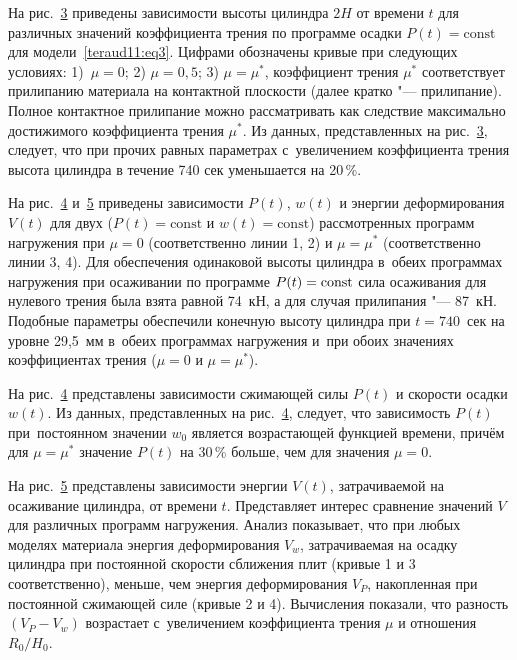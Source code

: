 На рис.~\hyperlink{teraud:pict3}{3} приведены зависимости высоты цилиндра $2H$ от времени $t$ для различных значений коэффициента трения по программе
осадки \mbox{$P(t)=\text{const}$} для модели~\eqref{teraud11:eq3}. 
Цифрами обозначены кривые при следующих условиях: 1)~$\mu =0$; 2) $\mu =0,5$; 3) $\mu =\mu^{*}$, коэффициент трения $\mu^{*}$ соответствует прилипанию материала
на контактной плоскости (далее кратко "--- прилипание). Полное контактное прилипание можно рассматривать как следствие
максимально достижимого коэффициента трения $\mu^{*}$. Из данных, представленных на рис.~\hyperlink{teraud:pict3}{3}, следует, что при прочих равных параметрах с~увеличением коэффициента трения высота цилиндра в течение 740 сек уменьшается на 20\,\%.



На рис.~\hyperlink{teraud:pict4}{4} и~\hyperlink{teraud:pict5}{5} приведены зависимости $P(t)$, $w(t)$ и энергии деформирования $V(t)$ для двух ($P(t)=\text{const}$ и
$w(t)=\text{const}$) рассмотренных программ нагружения при $\mu =0$ (соответственно линии 1, 2) и $\mu =\mu ^{*} $ (соответственно линии 3, 4). 
Для обеспечения одинаковой высоты цилиндра в~обеих программах нагружения при осаживании по программе $P(t)={\rm const}$ сила осаживания для нулевого трения
была взята равной 74~кН, а для случая прилипания "--- 87~кН. 
Подобные параметры обеспечили конечную высоту цилиндра при $t=740$~сек на уровне 29,5~мм в~обеих программах нагружения и~при обоих значениях коэффициентах трения ($\mu =0$ и $\mu =\mu^{*}$).

На рис.~\hyperlink{teraud:pict4}{4} представлены зависимости сжимающей силы $P(t)$ и скорости осадки $w(t)$. 
Из данных, представленных на рис.~\hyperlink{teraud:pict4}{4}, следует, что зависимость $P(t)$ при~постоянном значении $w_{0}$ является возрастающей функцией времени, причём для $\mu =\mu^{*}$ значение $P(t)$ на 30\,\% больше, чем для значения $\mu =0$.

На рис.~\hyperlink{teraud:pict5}{5} представлены зависимости энергии $V(t)$, затрачиваемой на осаживание цилиндра, от времени $t$. Представляет интерес
сравнение значений $V$ для различных программ нагружения. Анализ показывает, что при любых моделях материала  энергия
деформирования $V_{w}$, затрачиваемая на осадку цилиндра при постоянной скорости сближения плит (кривые 1 и 3 соответственно),
меньше, чем энергия деформирования $V_{P}$, накопленная при постоянной сжимающей силе (кривые 2 и 4). 
Вычисления показали, что разность $(V_P-V_w)$ возрастает с~увеличением коэффициента трения $\mu $ и отношения $R_{0}/H_{0}$.





